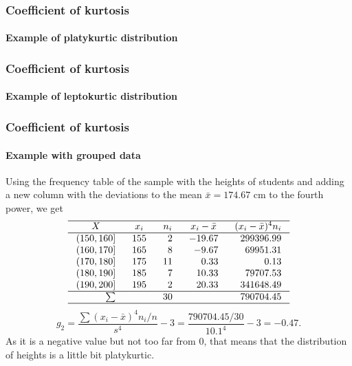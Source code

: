 \begin{frame}
\frametitle{Coefficient of kurtosis}
\framesubtitle{Example of platykurtic distribution}
\begin{center}
\scalebox{0.6}{}
\end{center}
\end{frame}


\begin{frame}
\frametitle{Coefficient of kurtosis}
\framesubtitle{Example of leptokurtic distribution}
\begin{center}
\scalebox{0.6}{}
\end{center} 
\end{frame}


\begin{frame}
\frametitle{Coefficient of kurtosis}
\framesubtitle{Example with grouped data}
Using the frequency table of the sample with the heights of students and adding a new column with the deviations to
the mean $\bar x = 174.67$ cm to the fourth power, we get
\[
\setlength\arraycolsep{3mm}
\setlength\arrayrulewidth{0.5pt}
\begin{array}{rrrrr}
\hline
\multicolumn{1}{c}{X} & \multicolumn{1}{c}{x_i} & \multicolumn{1}{c}{n_i} & \multicolumn{1}{c}{x_i-\bar x} & \multicolumn{1}{c}{(x_i-\bar x)^4 n_i} \\
\hline
(150,160] & 155 & 2 & -19.67 & 299396.99\\
(160,170] & 165 & 8 & -9.67 & 69951.31\\
(170,180] & 175 & 11 & 0.33 & 0.13\\
(180,190] & 185 & 7 & 10.33 & 79707.53\\
(190,200] & 195 & 2 & 20.33 & 341648.49\\
\hline
\sum &  & 30 & & 790704.45 \\
\hline
\end{array}
\]
\[
g_2 = \frac{\sum (x_i-\bar x)^4n_i/n}{s^4} - 3 = \frac{790704.45/30}{10.1^4}-3 = -0.47.
\]
As it is a negative value but not too far from 0, that means that the distribution of heights is a little
bit platykurtic.
\end{frame}


